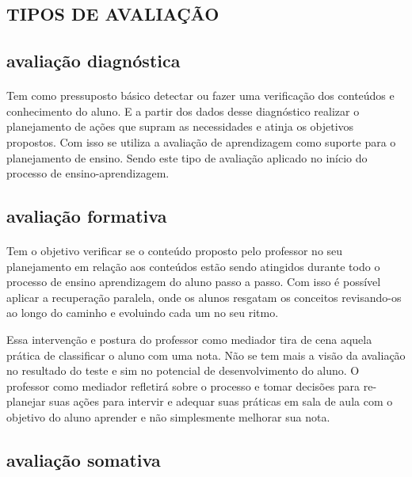 	\subsection{TIPOS DE AVALIAÇÃO}
	\paragraph{}
	\subsection{avaliação diagnóstica}
	\paragraph{}
	    Tem como pressuposto básico detectar ou fazer uma verificação dos conteúdos e conhecimento do aluno. E a partir dos dados desse diagnóstico realizar o planejamento de ações que supram as necessidades e atinja os objetivos propostos. Com isso se utiliza a avaliação de aprendizagem como suporte para o planejamento de ensino. Sendo este tipo de avaliação aplicado no início do processo de ensino-aprendizagem.
	\subsection{avaliação formativa}
	\paragraph{}
	    Tem o objetivo verificar se o conteúdo proposto pelo professor no seu planejamento em relação aos conteúdos estão sendo atingidos durante todo o processo de ensino aprendizagem do aluno passo a passo. Com isso é possível aplicar a recuperação paralela, onde os alunos resgatam os conceitos revisando-os ao longo do caminho e evoluindo cada um no seu ritmo.
	\par
	    Essa intervenção e postura do professor como mediador tira de cena aquela prática de classificar o aluno com uma nota. Não se tem mais a visão da avaliação no resultado do teste e sim no potencial de desenvolvimento do aluno. O professor como mediador refletirá sobre o processo e tomar decisões para re-planejar suas ações para intervir e adequar suas práticas em sala de aula com o objetivo do aluno aprender e não simplesmente melhorar sua nota.
	\subsection{avaliação somativa}
